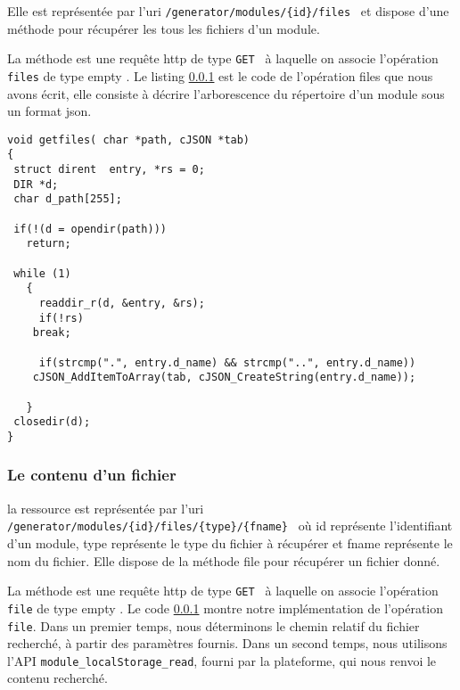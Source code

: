 \documentclass[a4paper,11pt]{report}
\begin{document}
Elle est représentée par l'uri {\tt  /generator/modules/\{id\}/files } et dispose d'une méthode  pour récupérer les tous les fichiers
d'un  module. 

La méthode est une requête http de type {\tt GET } à laquelle on associe l'opération {\tt files} de type  \og empty \fg  .
Le listing \ref{} est le code de l'opération files que nous avons écrit, elle consiste à décrire l'arborescence du répertoire d'un module
sous un format json. 

\begin{verbatim}
void getfiles( char *path, cJSON *tab)
{
 struct dirent  entry, *rs = 0;
 DIR *d;
 char d_path[255]; 
 
 if(!(d = opendir(path)))
   return;
  
 while (1)
   {
     readdir_r(d, &entry, &rs);
     if(!rs)
	break;
	      
     if(strcmp(".", entry.d_name) && strcmp("..", entry.d_name))
	cJSON_AddItemToArray(tab, cJSON_CreateString(entry.d_name));

   }
 closedir(d); 
}
\end{verbatim}

\subsubsection{Le contenu d'un fichier}
la ressource est représentée par l'uri {\tt  /generator/modules/\{id\}/files/\{type\}/\{fname\} } où id représente 
l'identifiant d'un module, type représente le type du fichier à récupérer et fname représente le nom du fichier. 
Elle  dispose de la  méthode \og file \fg  pour récupérer un  fichier donné. 

La méthode est une requête http de type {\tt GET } à laquelle on associe l'opération {\tt file} de type  \og empty \fg  .
Le code \ref{} montre notre implémentation de l'opération {\tt file}. Dans un premier temps, nous déterminons  le 
chemin relatif du fichier recherché, à partir des paramètres fournis. Dans un second temps, nous utilisons l'API
{\tt module\_localStorage\_read}, fourni par la plateforme, qui nous renvoi le contenu recherché.
\end{document}
